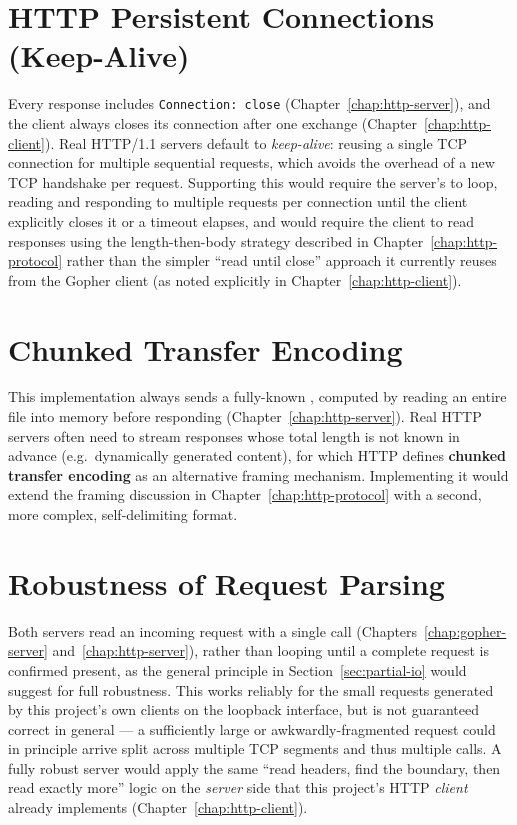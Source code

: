 \section{HTTP Persistent Connections (Keep-Alive)}

Every response includes \texttt{Connection: close} (Chapter~\ref{chap:http-server}), and the client always closes its connection after one exchange (Chapter~\ref{chap:http-client}). Real HTTP/1.1 servers default to \emph{keep-alive}: reusing a single TCP connection for multiple sequential requests, which avoids the overhead of a new TCP handshake per request. Supporting this would require the server's  to loop, reading and responding to multiple requests per connection until the client explicitly closes it or a timeout elapses, and would require the client to read responses using the length-then-body strategy described in Chapter~\ref{chap:http-protocol} rather than the simpler ``read until close'' approach it currently reuses from the Gopher client (as noted explicitly in Chapter~\ref{chap:http-client}).

\section{Chunked Transfer Encoding}

This implementation always sends a fully-known , computed by reading an entire file into memory before responding (Chapter~\ref{chap:http-server}). Real HTTP servers often need to stream responses whose total length is not known in advance (e.g.\ dynamically generated content), for which HTTP defines \textbf{chunked transfer encoding} as an alternative framing mechanism. Implementing it would extend the framing discussion in Chapter~\ref{chap:http-protocol} with a second, more complex, self-delimiting format.

\section{Robustness of Request Parsing}

Both servers read an incoming request with a single  call (Chapters~\ref{chap:gopher-server} and~\ref{chap:http-server}), rather than looping until a complete request is confirmed present, as the general principle in Section~\ref{sec:partial-io} would suggest for full robustness. This works reliably for the small requests generated by this project's own clients on the loopback interface, but is not guaranteed correct in general --- a sufficiently large or awkwardly-fragmented request could in principle arrive split across multiple TCP segments and thus multiple  calls. A fully robust server would apply the same ``read headers, find the boundary, then read exactly  more'' logic on the \emph{server} side that this project's HTTP \emph{client} already implements (Chapter~\ref{chap:http-client}).

